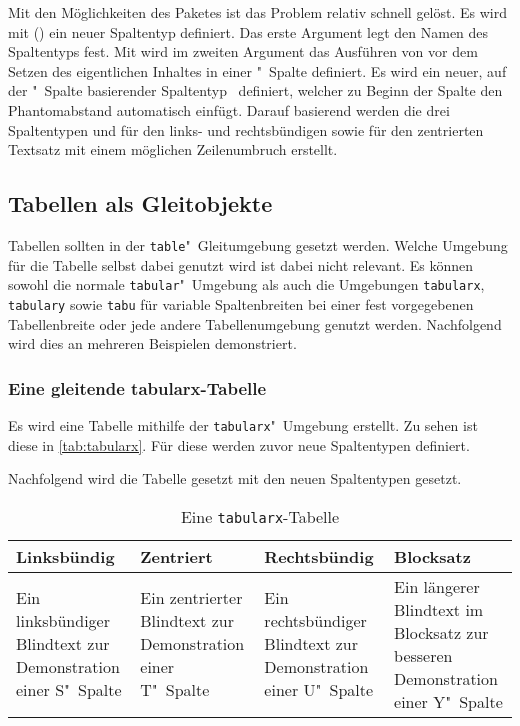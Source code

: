 \documentclass[%
  english,ngerman,%
  cdgeometry=no,DIV=12,%
  automark,%
  listof=toc,%
]{tudscrartcl}
\begin{document}
Mit den Möglichkeiten des Paketes  ist das Problem relativ 
schnell gelöst. Es wird mit () ein neuer 
Spaltentyp definiert. Das erste Argument legt den Namen des Spaltentyps fest. 
Mit  wird im zweiten Argument 
das Ausführen von  vor dem Setzen des eigentlichen Inhaltes 
in einer "~Spalte definiert. Es wird ein neuer, auf der 
"~Spalte basierender Spaltentyp~ definiert, welcher zu 
Beginn der Spalte den Phantomabstand automatisch einfügt. Darauf basierend 
werden die drei Spaltentypen  und  für den links- und 
rechtsbündigen sowie  für den zentrierten Textsatz mit einem 
möglichen Zeilenumbruch erstellt.
%
\begin{Trunk+}
\subsection{Tabellen als Gleitobjekte}
Tabellen sollten in der \texttt{table}"~Gleitumgebung gesetzt werden. 
Welche Umgebung für die Tabelle selbst dabei genutzt wird ist dabei
nicht relevant. Es können sowohl die normale \texttt{tabular}"~Umgebung 
als auch die Umgebungen \texttt{tabularx}, \texttt{tabulary} sowie 
\texttt{tabu} für variable Spaltenbreiten bei einer fest vorgegebenen 
Tabellenbreite oder jede andere Tabellenumgebung genutzt werden. 
Nachfolgend wird dies an mehreren Beispielen demonstriert.

\subsubsection{Eine gleitende tabularx-Tabelle}
Es wird eine Tabelle mithilfe der \texttt{tabularx}"~Umgebung erstellt. 
Zu sehen ist diese in \autoref{tab:tabularx}. Für diese werden zuvor 
neue Spaltentypen definiert.

\end{Trunk+}
\CodeHook{\renewcommand*{\newcolumntype}[2]{}}
\begin{Trunk*}

\end{Trunk*}
%
Nachfolgend wird die Tabelle gesetzt mit den neuen Spaltentypen gesetzt.
%
\begin{Trunk}
\begin{table}
\begin{tabularx}{\textwidth}{@{}DEFY@{}}
\toprule
\textbf{Linksbündig} & \textbf{Zentriert} & 
\textbf{Rechtsbündig} & \textbf{Blocksatz} \tabularnewline
\midrule
Ein linksbündiger Blindtext zur Demonstration einer S"~Spalte &
Ein zentrierter Blindtext zur Demonstration einer T"~Spalte &
Ein rechtsbündiger Blindtext zur Demonstration einer U"~Spalte &
Ein längerer Blindtext im Blocksatz zur besseren Demonstration
einer Y"~Spalte\tabularnewline
\bottomrule
\end{tabularx}
\caption{Eine \texttt{tabularx}-Tabelle}\label{tab:tabularx}
\end{table}

\end{Trunk}
\end{document}
